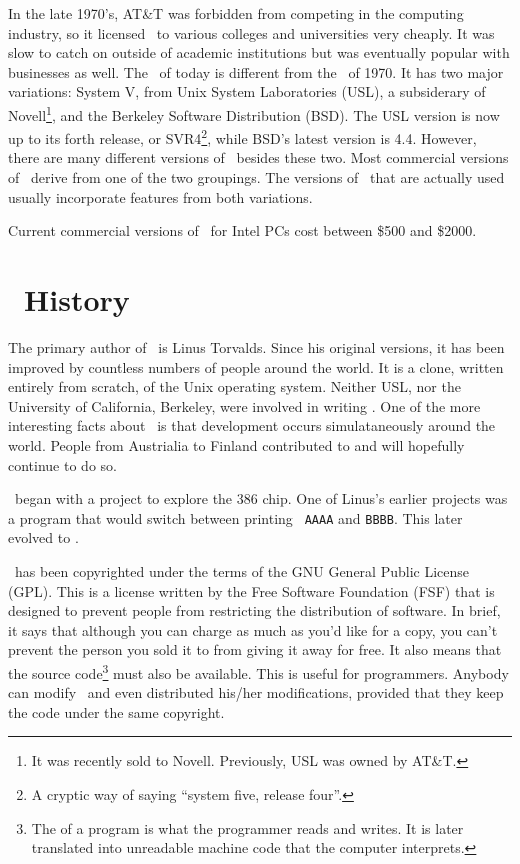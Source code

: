 In the late 1970's, AT\&T was forbidden from competing in the
computing industry, so it licensed \unix\ to various colleges and
universities very cheaply.  It was slow to catch on outside of
academic institutions but was eventually popular with businesses as
well. The \unix\ of today is different from the \unix\ of 1970.  It
has two major variations: System V, from Unix System Laboratories
(USL), a subsiderary of
Novell\footnote{It was recently sold to Novell.  Previously, USL was
  owned by AT\&T.}, and the Berkeley Software
Distribution (BSD).  
The USL version is now up to its forth release, or SVR4\footnote{A
  cryptic way of saying ``system five, release four''.}, while BSD's
latest version is 4.4.  However, there are many different versions of
\unix\ besides these two.  Most commercial versions of \unix\ derive
from one of the two groupings. The versions of \unix\ that
are actually used usually incorporate features from both variations.

Current commercial versions of \unix\ for Intel PCs cost
between \$500 and \$2000.

\section{\linux\ History}

The primary author of \linux\ is Linus Torvalds.  
Since his original versions, it has been improved by countless numbers
of people around the world.  It is a clone, written entirely from
scratch, of the Unix operating system.  Neither USL, nor the
University of California, Berkeley, were involved in
writing \linux.  One of the more interesting facts about \linux\ is
that development occurs simulataneously around the world.  People from
Austrialia to Finland contributed to \linux and will hopefully
continue to do so.

\linux\ began with a project to explore the 386 chip. One of Linus's
earlier projects was a program that would switch between printing {\tt
AAAA} and {\tt BBBB}. This later evolved to \linux.

\linux\ has been copyrighted under the terms of the GNU General Public
License (GPL).  This is a license
written by the
Free Software Foundation (FSF) that
is designed to prevent people from restricting the distribution of
software.  In brief, it says that although you can charge as much as
you'd like for a copy, you can't prevent the person you sold it to
from giving it away for free. It also means that the source
code\footnote{The  of a program is what the
  programmer reads and writes.  It is later translated into unreadable
  machine code that the computer interprets.} must also be available.
This is useful for programmers.  Anybody can modify \linux\ and even
distributed his/her modifications, provided that they keep the code
under the same copyright.

